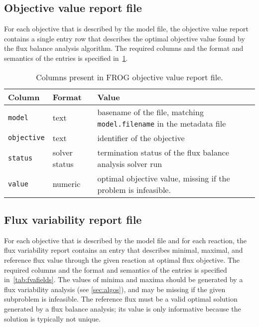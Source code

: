 \subsection{Objective value report file}
\label{sec:obj}

For each objective that is described by the model file, the objective value report contains a single entry row that describes the optimal objective value found by the flux balance analysis algorithm. The required columns and the format and semantics of the entries is specified in~\cref{tab:objfields}.



\begin{table}[p]\tablefont
\begin{tabular}{llp{30em}}
\toprule
Column & Format & Value \\
\midrule
\verb|model|
 & text
 & basename of the file, matching \verb|model.filename| in the metadata file
 \\
\verb|objective|
 & text
 & identifier of the objective
 \\
\verb|status|
 & solver status
 & termination status of the flux balance analysis solver run
 \\
\verb|value|
 & numeric
 & optimal objective value, missing if the problem is infeasible.
 \\
\bottomrule
\end{tabular}
\caption{Columns present in FROG objective value report file.}
\label{tab:objfields}
\end{table}

\subsection{Flux variability report file}
\label{sec:fva}
For each objective that is described by the model file and for each reaction, the flux variability report contains an entry that describes minimal, maximal, and reference flux value through the given reaction at optimal flux objective. The required columns and the format and semantics of the entries is specified in~\cref{tab:fvafields}. The values of minima and maxima should be generated by a flux variability analysis (see \cref{sec:algos}), and may be missing if the given subproblem is infeasible. The reference flux must be a valid optimal solution generated by a flux balance analysis; its value is only informative because the solution is typically not unique.

